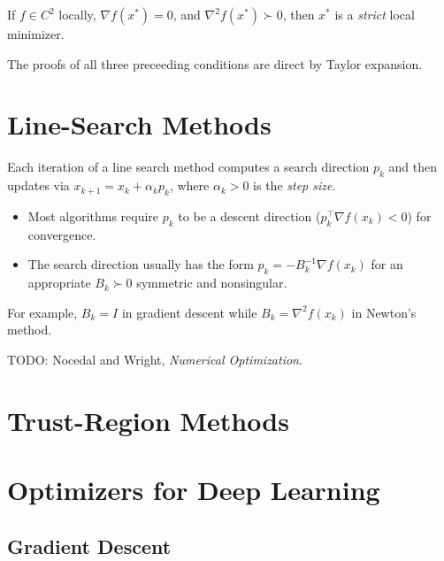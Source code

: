 \documentclass[11pt, letterpaper]{article}
\begin{document}
\begin{concept}
    If \(f \in C^2\) locally, \(\nabla f(x^*) = 0\), and \(\nabla^2 f(x^*) \succ 0\), then \(x^*\) is a \textit{strict} local minimizer. 
\end{concept}

\begin{remark}
    The proofs of all three preceeding conditions are direct by Taylor expansion. 
\end{remark}

\newpage
\section{Line-Search Methods}

\begin{concept}
    Each iteration of a line search method computes a search direction \(p_k\) and then updates via \(x_{k+1} = x_k + \alpha_k p_k\), where \(\alpha_k > 0\) is the \textit{step size}. 
    \begin{itemize}
        \item Most algorithms require \(p_k\) to be a descent direction (\(p_k^\top \nabla f(x_k) < 0\)) for convergence. 
        \item The search direction usually has the form \(p_k = -B_k^{-1} \nabla f(x_k)\) for an appropriate \(B_k \succ 0\) symmetric and nonsingular. 
    \end{itemize}

    For example, \(B_k = I\) in gradient descent while \(B_k = \nabla^2 f(x_k)\) in Newton's method. 
\end{concept}

TODO: Nocedal and Wright, \textit{Numerical Optimization}. 

\newpage
\section{Trust-Region Methods}

\begin{concept}
\end{concept}

\newpage
\section{Optimizers for Deep Learning}

\subsection{Gradient Descent}
\end{document}
